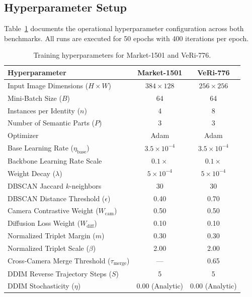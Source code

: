 \subsection{Hyperparameter Setup}

Table~\ref{tab:hyperparams} documents the operational hyperparameter configuration across both benchmarks. All runs are executed for 50 epochs with 400 iterations per epoch.

\begin{table}[ht]
    \centering
    \caption[Training hyperparameters for Market-1501 and VeRi-776]{Training hyperparameters for Market-1501 and VeRi-776.}
    \label{tab:hyperparams}
    \begin{tabular}{l c c}
        \toprule
        \textbf{Hyperparameter} & \textbf{Market-1501} & \textbf{VeRi-776} \\
        \midrule
        Input Image Dimensions ($H \times W$) & $384 \times 128$ & $256 \times 256$ \\
        Mini-Batch Size ($B$)                & 64                & 64                \\
        Instances per Identity ($n$)         & 4                 & 8                 \\
        Number of Semantic Parts ($P$)       & 3                 & 3                 \\
        Optimizer                            & Adam \cite{kingma2015adam} & Adam \cite{kingma2015adam} \\
        Base Learning Rate ($\eta_{\text{base}}$) & $3.5 \times 10^{-4}$ & $3.5 \times 10^{-4}$ \\
        Backbone Learning Rate Scale         & $0.1\times$       & $0.1\times$       \\
        Weight Decay ($\lambda$)             & $5 \times 10^{-4}$ & $5 \times 10^{-4}$ \\
        DBSCAN Jaccard $k$-neighbors         & 30                & 30                \\
        DBSCAN Distance Threshold ($\epsilon$)& 0.40             & 0.70              \\
        Camera Contrastive Weight ($W_{\text{cam}}$) & 0.50      & 0.50              \\
        Diffusion Loss Weight ($W_{\text{diff}}$)    & 0.10      & 0.10              \\
        Normalized Triplet Margin ($m$)      & 0.30              & 0.30              \\
        Normalized Triplet Scale ($\beta$)   & 2.00              & 2.00              \\
        Cross-Camera Merge Threshold ($\tau_{\text{merge}}$) & --- & 0.65       \\
        DDIM Reverse Trajectory Steps ($S$)  & 5                 & 5                 \\
        DDIM Stochasticity ($\eta$)          & 0.00 (Analytic)   & 0.00 (Analytic)   \\
        \bottomrule
    \end{tabular}
\end{table}

